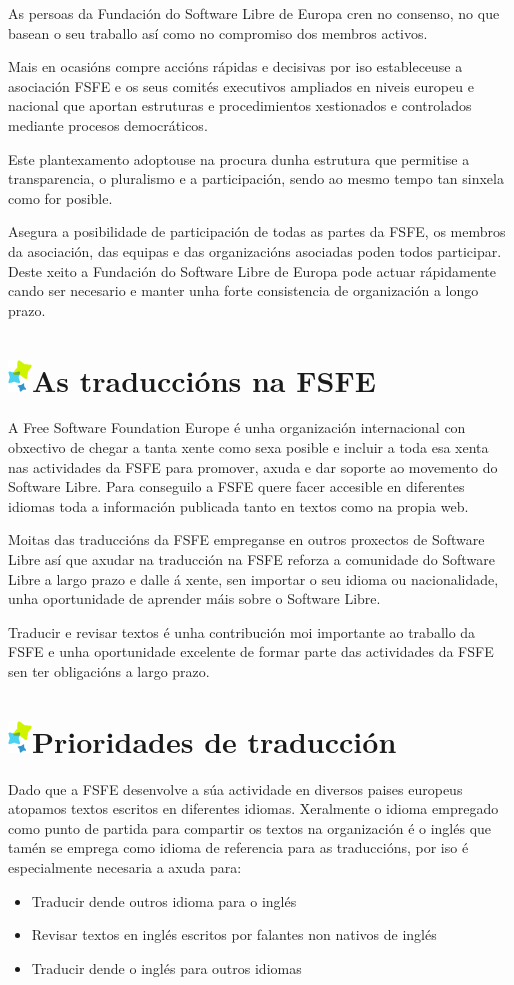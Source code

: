 \documentclass[10pt,foldmark,tumble]{leaflet}
\newcommand{\tit}[1]{\section{\includegraphics{item.png}#1}}
\begin{document}
As persoas da Fundación do Software Libre de Europa cren no consenso, no que basean o seu traballo así como no compromiso dos membros activos. 

Mais en ocasións compre accións rápidas e decisivas por iso estableceuse a asociación FSFE e os seus comités executivos ampliados en niveis europeu e nacional que aportan estruturas e procedimientos xestionados e controlados mediante procesos democráticos.

Este plantexamento adoptouse na procura dunha estrutura que permitise a transparencia, o pluralismo e a participación, sendo ao mesmo tempo tan sinxela como for posible.

Asegura a posibilidade de participación de todas as partes da FSFE, os membros da asociación, das equipas e das organizacións asociadas poden todos participar. Deste xeito a Fundación do Software Libre de Europa pode actuar rápidamente cando ser necesario e manter unha forte consistencia de organización a longo prazo.

\tit{As traduccións na FSFE}

A Free Software Foundation Europe é unha organización internacional con obxectivo de chegar a tanta xente como sexa posible e incluir a toda esa xenta nas actividades da FSFE para promover, axuda e dar soporte ao movemento do Software Libre. Para conseguilo a FSFE quere facer accesible en diferentes idiomas toda a información publicada tanto en textos como na propia web.

Moitas das traduccións da FSFE empreganse en outros proxectos de Software Libre así que axudar na traducción na FSFE reforza a comunidade do Software Libre a largo prazo e dalle á xente, sen importar o seu idioma ou nacionalidade, unha oportunidade de aprender máis sobre o Software Libre.

Traducir e revisar textos é unha contribución moi importante ao traballo da FSFE e unha oportunidade excelente de formar parte das actividades da FSFE sen ter obligacións a largo prazo.

\tit{Prioridades de traducción}

Dado que a FSFE desenvolve a súa actividade en diversos paises europeus atopamos textos escritos en diferentes idiomas. Xeralmente o idioma empregado como punto de partida para compartir os textos na organización é o inglés que tamén se emprega como idioma de referencia para as traduccións, por iso é especialmente necesaria a axuda para: 

\begin{itemize}
    \item Traducir dende outros idioma para o inglés
    \item Revisar textos en inglés escritos por falantes non nativos de inglés
    \item Traducir dende o inglés para outros idiomas
\end{itemize}
\end{document}
